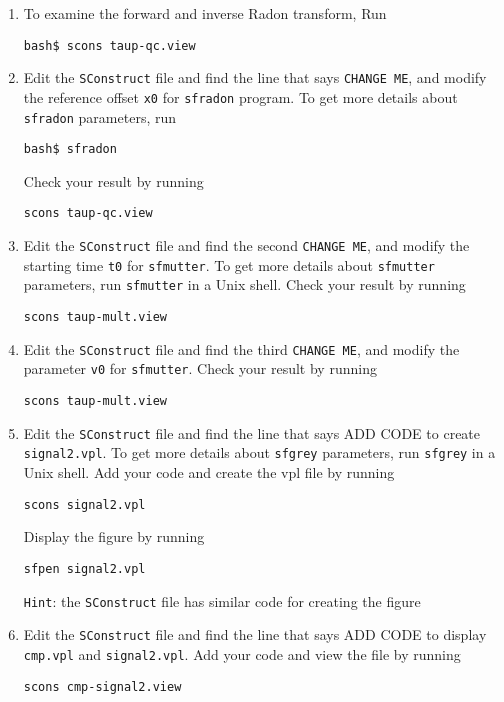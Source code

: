 \begin{enumerate}
\item To examine the forward and inverse Radon transform, Run
\begin{verbatim}
bash$ scons taup-qc.view
\end{verbatim}


\item Edit the \texttt{SConstruct} file and find the line that says \texttt{CHANGE ME}, and modify the reference offset \texttt{x0} for \texttt{sfradon} program. To get more details about \texttt{sfradon} parameters, run 
\begin{verbatim}
bash$ sfradon
\end{verbatim}
Check your result by running
\begin{verbatim}
scons taup-qc.view
\end{verbatim}

\item Edit the \texttt{SConstruct} file and find the second \texttt{CHANGE ME}, and modify the starting time \texttt{t0} for \texttt{sfmutter}. To get more details about \texttt{sfmutter} parameters, run \texttt{sfmutter} in a Unix shell. Check your result by running
\begin{verbatim}
scons taup-mult.view
\end{verbatim}

\item Edit the \texttt{SConstruct} file and find the third \texttt{CHANGE ME}, and modify the parameter \texttt{v0} for \texttt{sfmutter}. Check your result by running
\begin{verbatim}
scons taup-mult.view
\end{verbatim}

\item Edit the \texttt{SConstruct} file and find the line that says ADD CODE to create \texttt{signal2.vpl}. To get more details about \texttt{sfgrey} parameters, run \texttt{sfgrey} in a Unix shell. Add your code and create the vpl file by running
\begin{verbatim}
scons signal2.vpl
\end{verbatim}

Display the figure by running
\begin{verbatim}
sfpen signal2.vpl
\end{verbatim}
\texttt{Hint}: the \texttt{SConstruct} file has similar code for creating the figure

\item Edit the \texttt{SConstruct} file and find the line that says ADD CODE to display \texttt{cmp.vpl} and \texttt{signal2.vpl}. Add your code and view the file by running
\begin{verbatim}
scons cmp-signal2.view
\end{verbatim}


\end{enumerate}
